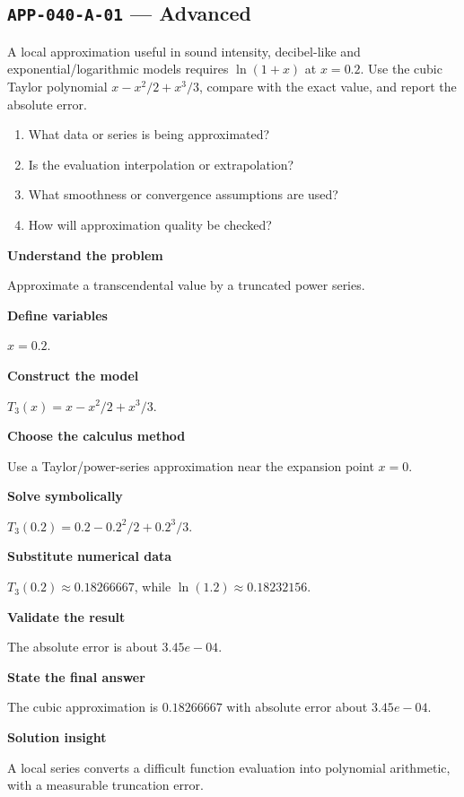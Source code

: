 \documentclass[11pt]{book}
\newcommand{\pid}[1]{\texttt{#1}}
\begin{document}
\subsection*{\pid{APP-040-A-01} — Advanced}
\begin{problembox}
A local approximation useful in sound intensity, decibel-like and exponential/logarithmic models requires $\ln(1+x)$ at $x=0.2$. Use the cubic Taylor polynomial $x-x^2/2+x^3/3$, compare with the exact value, and report the absolute error.
\end{problembox}
\begin{promptbox}\begin{enumerate}
\item What data or series is being approximated?
\item Is the evaluation interpolation or extrapolation?
\item What smoothness or convergence assumptions are used?
\item How will approximation quality be checked?
\end{enumerate}\end{promptbox}
\begin{solutionbox}
\textbf{Understand the problem}\par Approximate a transcendental value by a truncated power series.\par\medskip
\textbf{Define variables}\par $x=0.2$.\par\medskip
\textbf{Construct the model}\par $T_3(x)=x-x^2/2+x^3/3$.\par\medskip
\textbf{Choose the calculus method}\par Use a Taylor/power-series approximation near the expansion point $x=0$.\par\medskip
\textbf{Solve symbolically}\par $T_3(0.2)=0.2-0.2^2/2+0.2^3/3$.\par\medskip
\textbf{Substitute numerical data}\par $T_3(0.2)\approx 0.18266667$, while $\ln(1.2)\approx 0.18232156$.\par\medskip
\textbf{Validate the result}\par The absolute error is about $3.45e-04$.\par\medskip
\textbf{State the final answer}\par The cubic approximation is $0.18266667$ with absolute error about $3.45e-04$.\par\medskip
\textbf{Solution insight}\par A local series converts a difficult function evaluation into polynomial arithmetic, with a measurable truncation error.\par\medskip
\end{solutionbox}
\end{document}
